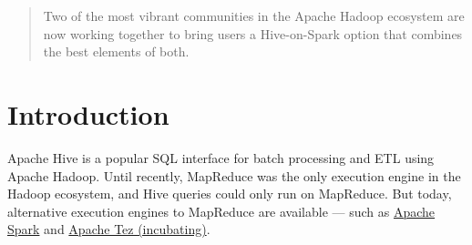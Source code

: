 \documentclass{vldb}
\begin{document}


\maketitle

\begin{abstract}
Two of the most vibrant communities in the Apache Hadoop
ecosystem are now working together to bring users a Hive-on-Spark option
that combines the best elements of both.
\end{abstract}

\section{Introduction}


Apache Hive is a popular SQL interface for batch processing and ETL
using Apache Hadoop. Until recently, MapReduce was the only execution
engine in the Hadoop ecosystem, and Hive queries could only run on
MapReduce. But today, alternative execution engines to MapReduce are
available --- such as \href{http://spark.apache.org}{Apache Spark} and
\href{http://incubator.apache.org/projects/tez.html}{Apache Tez
(incubating)}.
\end{document}
